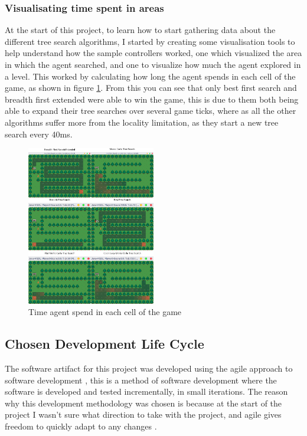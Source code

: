 \documentclass[journal]{IEEEtran}
\begin{document}
	\subsubsection{Visualisating time spent in areas}
	At the start of this project, to learn how to start gathering data about the different tree search algorithms, I started by creating some visualisation tools to help understand how the sample controllers worked, one which visualized the area in which the agent searched, and one to visualize how much the agent explored in a level. This worked by
 calculating how long the agent spends in each cell of the game, as shown in figure \ref{fig:treeSearchComparson}.
	From this you can see that only best first search and breadth first extended were able to win the game, this is due to them both being able to expand their tree searches over several game ticks, where as all the other algorithms suffer more from the locality limitation, as they start a new tree search every 40ms.
	\begin{figure}[h]
		   \centering
		   \includegraphics[width=0.5\textwidth]{treeSearchComparison}
		   \caption{ Time agent spend in each cell of the game }
		   \label{fig:treeSearchComparson}
	\end{figure}


		
	\subsection{Chosen Development Life Cycle}
		The software artifact for this project was developed using the agile approach to software development \cite{beck2001manifesto, cockburn2001agile, dybaa2008empirical}, this is a method of software development where the software is developed and tested incrementally, in small iterations. The reason why this development methodology was chosen is because at the start of the project I wasn't sure what direction to take with the project, and agile gives freedom to quickly adapt to any changes \cite{cockburn2001agile}. 
\end{document}
